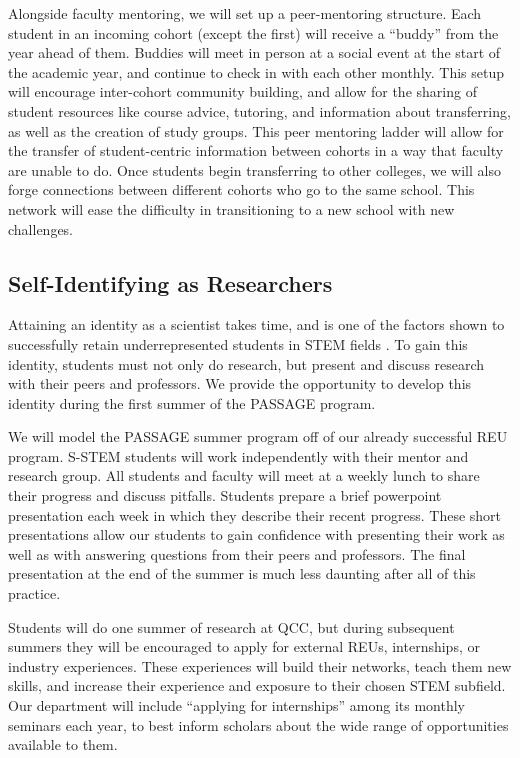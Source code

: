 \documentclass[12pt]{article}
\begin{document}
Alongside faculty mentoring, we will set up a peer-mentoring structure.  Each student in an incoming cohort (except the first) will receive a ``buddy'' from the year ahead of them.  Buddies will meet in person at a social event at the start of the academic year, and continue to check in with each other monthly.  This setup will encourage inter-cohort community building, and allow for the sharing of student resources like course advice, tutoring, and information about transferring, as well as the creation of study groups. This peer mentoring ladder will allow for the transfer of student-centric information between cohorts in a way that faculty are unable to do.   Once students begin transferring to other colleges, we will also forge connections between different cohorts who go to the same school.  This network will ease the difficulty in transitioning to a new school with new challenges.  

\subsection{Self-Identifying as Researchers}

Attaining an identity as a scientist takes time, and is one of the factors shown to successfully retain underrepresented students in STEM fields \citep{Hurtado09,Johnson11,Rodriguez}.  To gain this identity, students must not only do research, but present and discuss research with their peers and professors.   We provide the opportunity to develop this identity during the first summer of the PASSAGE program.  

We will model the PASSAGE summer program off of our already successful REU program.  S-STEM students will work independently with their mentor and research group.  All students and faculty will meet at a weekly lunch to share their progress and discuss pitfalls.  Students prepare a brief powerpoint presentation each week in which they describe their recent progress.  These short presentations allow our students to gain confidence with presenting their work as well as with answering questions from their peers and professors.  The final presentation at the end of the summer is much less daunting after all of this practice.  

Students will do one summer of research at QCC, but during subsequent summers they will be encouraged to apply for external REUs, internships, or industry experiences.  These experiences will build their networks, teach them new skills, and  increase their experience and exposure to their chosen STEM subfield.  Our department will include ``applying for internships'' among its monthly seminars each year, to best inform scholars about the wide range of opportunities available to them.  
\end{document}

